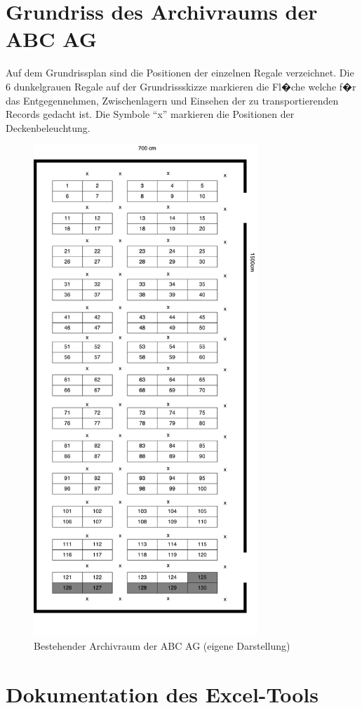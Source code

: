 \documentclass[a4paper,twoside,10pt]{report}
\begin{document}
\begin{appendices}
\chapter{Grundriss des Archivraums der ABC AG}\label{anh:archplan}
Auf dem Grundrissplan sind die Positionen der einzelnen Regale verzeichnet. Die 6 dunkelgrauen Regale auf der Grundrissskizze markieren die Fl�che welche f�r das Entgegennehmen, Zwischenlagern und Einsehen der zu transportierenden Records gedacht ist. Die Symbole "`x"' markieren die Positionen der Deckenbeleuchtung.
\begin{figure}[htb]%
\centering
\includegraphics[width=0.75\textwidth]{Archivraum.pdf}%
\caption{Bestehender Archivraum der ABC AG (eigene Darstellung)}%
\label{img:archplan}%
\end{figure}

\cleardoublepage
\chapter{Dokumentation des Excel-Tools}\label{anh:excel}


\end{appendices}
\end{document}
